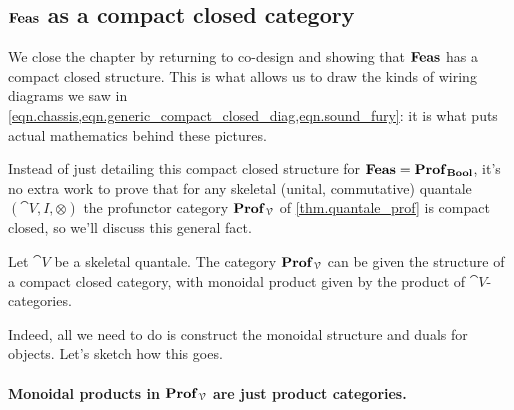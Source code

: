 \documentclass[7Sketches]{subfiles}
\begin{document}
  
\subsection{$\mathbf{Feas}$ as a compact closed category}
%
%
We close the chapter by returning to co-design and showing that $\mathbf{Feas}$ has a compact closed structure. This is what allows us to draw the kinds of wiring diagrams we saw in \cref{eqn.chassis,eqn.generic_compact_closed_diag,eqn.sound_fury}: it is what puts actual mathematics behind these pictures.

Instead of just detailing this compact closed structure for $\mathbf{Feas} =
\mathbf{Prof}_{\mathbf{Bool}}$, it's no extra work to prove that for any skeletal (unital,
commutative) quantale $(\cat{V},I,\otimes)$ the profunctor category
$\mathbf{Prof}_{\mathcal{V}}$ of \cref{thm.quantale_prof} is compact closed, so we'll discuss
this general fact.

\begin{theorem}
Let $\cat{V}$ be a skeletal quantale. The category $\mathbf{Prof}_{\mathcal{V}}$ can be given
the structure of a compact closed category, with monoidal product given by the
product of $\cat{V}$-categories.
\end{theorem}

Indeed, all we need to do is construct the monoidal structure and duals for
objects. Let's sketch how this goes.

\paragraph{Monoidal products in $\mathbf{Prof}_{\mathcal{V}}$ are just product categories.}
%
\end{document}
